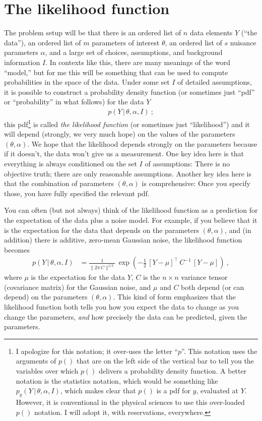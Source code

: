 \documentclass{article}
\newcommand{\given}{\,|\,}
\newcommand{\norm}[1]{\lVert{#1}\rVert}
\begin{document}
\section{The likelihood function}\label{sec:lf}
The problem setup will be that there is an ordered list of $n$ data elements $Y$ (``the data''), an ordered list of $m$ parameters of interest $\theta$, an ordered list of $s$ nuisance parameters $\alpha$, and a large set of choices, assumptions, and background information $I$.
In contexts like this, there are many meanings of the word ``model,'' but for me this will be something that can be used to compute probabilities in the space of the data.
Under some set $I$ of detailed assumptions, it is possible to construct a probability density function (or sometimes just ``pdf'' or ``probability'' in what follows) for the data $Y$
\begin{align}
    p(Y\given\theta,\alpha,I) ~;
\end{align}
this pdf\footnote{%
I apologize for this notation; it over-uses the letter ``$p$''.
This notation uses the arguments of $p()$ that are on the left side of the vertical bar to tell you the variables over which $p()$ delivers a probability density function.
A better notation is the statistics notation, which would be something like $p_y(Y\given\theta,\alpha,I)$, which makes clear that $p()$ is a pdf for $y$, evaluated at $Y$.
However, it is conventional in the physical sciences to use this over-loaded $p()$ notation.
I will adopt it, with reservations, everywhere.}
is called \emph{the likelihood function} (or sometimes just ``likelihood'') and it will depend (strongly, we very much hope) on the values of the parameters $(\theta, \alpha)$.
We hope that the likelihood depends strongly on the parameters because if it doesn't, the data won't give us a measurement.
One key idea here is that everything is always conditioned on the set $I$ of assumptions: There is no objective truth; there are only reasonable assumptions.
Another key idea here is that the combination of parameters $(\theta,\alpha)$ is comprehensive: Once you specify those, you have fully specified the relevant pdf.

You can often (but not always) think of the likelihood function as a prediction for the expectation of the data plus a noise model.
For example, if you believe that it is the expectation for the data that depends on the parameters $(\theta, \alpha)$, and (in addition) there is additive, zero-mean Gaussian noise, the likelihood function becomes
\begin{align}
    p(Y\given\theta,\alpha,I) &= \frac{1}{\norm{2\pi\,C}^{1/2}}\,\exp\left(-\frac{1}{2}\,[Y - \mu]^\top\,C^{-1}\,[Y - \mu]\right) ~,
\end{align}
where $\mu$ is the expectation for the data $Y$,
$C$ is the $n\times n$ variance tensor (covariance matrix) for the Gaussian noise,
and $\mu$ and $C$ both depend (or can depend) on the parameters $(\theta,\alpha)$.
This kind of form emphasizes that the likelihood function both tells you how you expect the data to change as you change the parameters, \emph{and} how precisely the data can be predicted, given the parameters.
\end{document}
